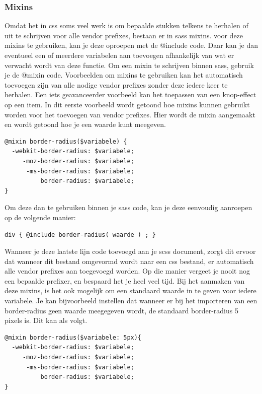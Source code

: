 \documentclass[pdftex,a4paper,12pt,twoside]{report}
\begin{document}
\subsubsection{Mixins}
Omdat het in css soms veel werk is om bepaalde stukken telkens te herhalen of uit te schrijven voor alle vendor prefixes, bestaan er in sass mixins. voor deze mixins te gebruiken, kan je deze oproepen met de @include code. Daar kan je dan eventueel een of meerdere variabelen aan toevoegen afhankelijk van wat er verwacht wordt van deze functie. Om een mixin te schrijven binnen sass, gebruik je de @mixin code.\newline
Voorbeelden om mixins te gebruiken kan het automatisch toevoegen zijn van alle nodige vendor prefixes zonder deze iedere keer te herhalen. Een iets geavanceerder voorbeeld kan het toepassen van een knop-effect op een item.\newline
In dit eerste voorbeeld wordt getoond hoe mixins kunnen gebruikt worden voor het toevoegen van vendor prefixes. Hier wordt de mixin aangemaakt en wordt getoond hoe je een waarde kunt meegeven.
\begin{lstlisting}
@mixin border-radius($variabele) {
  -webkit-border-radius: $variabele;
     -moz-border-radius: $variabele;
      -ms-border-radius: $variabele;
          border-radius: $variabele;
}
\end{lstlisting}
Om deze dan te gebruiken binnen je sass code, kan je deze eenvoudig aanroepen op de volgende manier:
\begin{lstlisting}
div { @include border-radius( waarde ) ; }
\end{lstlisting}
Wanneer je deze laatste lijn code toevoegd aan je scss document, zorgt dit ervoor dat wanneer dit bestand omgevormd wordt naar een css bestand, er automatisch alle vendor prefixes aan toegevoegd worden. Op die manier vergeet je nooit nog een bepaalde prefixer, en bespaard het je heel veel tijd.\newline
Bij het aanmaken van deze mixins, is het ook mogelijk om een standaard waarde in te geven voor iedere variabele. Je kan bijvoorbeeld instellen dat wanneer er bij het importeren van een border-radius geen waarde meegegeven wordt, de standaard border-radius 5 pixels is. Dit kan als volgt.
\begin{lstlisting}
@mixin border-radius($variabele: 5px){
  -webkit-border-radius: $variabele;
     -moz-border-radius: $variabele;
      -ms-border-radius: $variabele;
          border-radius: $variabele;
}
\end{lstlisting}
\end{document}

